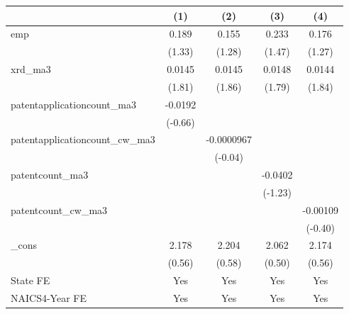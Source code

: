 {
\def\sym#1{\ifmmode^{#1}\else\(^{#1}\)\fi}
\begin{tabular}{l*{4}{c}}
\hline\hline
            &\multicolumn{1}{c}{(1)}         &\multicolumn{1}{c}{(2)}         &\multicolumn{1}{c}{(3)}         &\multicolumn{1}{c}{(4)}         \\
\hline
emp         &       0.189         &       0.155         &       0.233         &       0.176         \\
            &      (1.33)         &      (1.28)         &      (1.47)         &      (1.27)         \\
[1em]
xrd\_ma3     &      0.0145         &      0.0145         &      0.0148         &      0.0144         \\
            &      (1.81)         &      (1.86)         &      (1.79)         &      (1.84)         \\
[1em]
patentapplicationcount\_ma3&     -0.0192         &                     &                     &                     \\
            &     (-0.66)         &                     &                     &                     \\
[1em]
patentapplicationcount\_cw\_ma3&                     &  -0.0000967         &                     &                     \\
            &                     &     (-0.04)         &                     &                     \\
[1em]
patentcount\_ma3&                     &                     &     -0.0402         &                     \\
            &                     &                     &     (-1.23)         &                     \\
[1em]
patentcount\_cw\_ma3&                     &                     &                     &    -0.00109         \\
            &                     &                     &                     &     (-0.40)         \\
[1em]
\_cons      &       2.178         &       2.204         &       2.062         &       2.174         \\
            &      (0.56)         &      (0.58)         &      (0.50)         &      (0.56)         \\
[1em]
State FE    &         Yes         &         Yes         &         Yes         &         Yes         \\
[1em]
NAICS4-Year FE&         Yes         &         Yes         &         Yes         &         Yes         \\

\end{tabular}}
